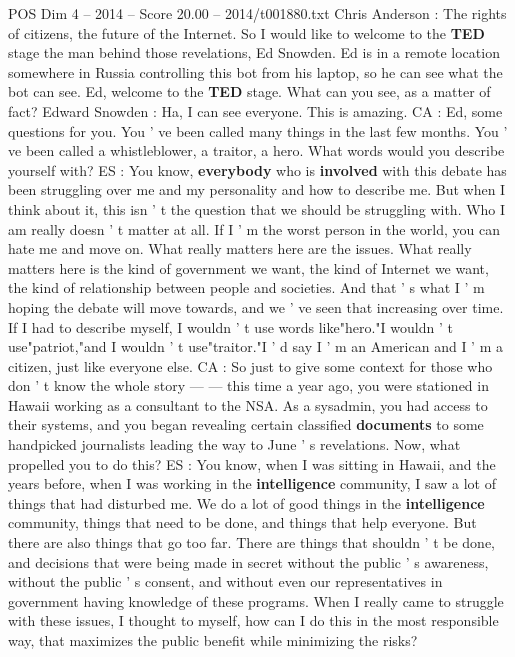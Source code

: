 \begin{textsample}{POS Dim 4 – 2014 – Score 20.00 – 2014/t001880.txt}  \label{ex:f4_pos_069}
Chris Anderson : The rights of citizens, the future of the Internet.
So I would like to welcome to the \textbf{TED} stage the man behind those revelations, Ed Snowden.
Ed is in a remote location somewhere in Russia controlling this bot from his laptop, so he can see what the bot can see.
Ed, welcome to the \textbf{TED} stage.
What can you see, as a matter of fact?
Edward Snowden : Ha, I can see everyone.
This is amazing.
CA : Ed, some questions for you.
You ' ve been called many things in the last few months.
You ' ve been called a whistleblower, a traitor, a hero.
What words would you describe yourself with?
ES : You know, \textbf{everybody} who is \textbf{involved} with this debate has been struggling over me and my personality and how to describe me.
But when I think about it, this isn ' t the question that we should be struggling with.
Who I am really doesn ' t matter at all.
If I ' m the worst person in the world, you can hate me and move on.
What really matters here are the issues.
What really matters here is the kind of government we want, the kind of Internet we want, the kind of relationship between people and societies.
And that ' s what I ' m hoping the debate will move towards, and we ' ve seen that increasing over time.
If I had to describe myself, I wouldn ' t use words like"hero."I wouldn ' t use"patriot,"and I wouldn ' t use"traitor."I ' d say I ' m an American and I ' m a citizen, just like everyone else.
CA : So just to give some context for those who don ' t know the whole story — — this time a year ago, you were stationed in Hawaii working as a consultant to the NSA.
As a sysadmin, you had access to their systems, and you began revealing certain classified \textbf{documents} to some handpicked journalists leading the way to June ' s revelations.
Now, what propelled you to do this?
ES : You know, when I was sitting in Hawaii, and the years before, when I was working in the \textbf{intelligence} community, I saw a lot of things that had disturbed me.
We do a lot of good things in the \textbf{intelligence} community, things that need to be done, and things that help everyone.
But there are also things that go too far.
There are things that shouldn ' t be done, and decisions that were being made in secret without the public ' s awareness, without the public ' s consent, and without even our representatives in government having knowledge of these programs.
When I really came to struggle with these issues, I thought to myself, how can I do this in the most responsible way, that maximizes the public benefit while minimizing the risks?

\end{textsample}

